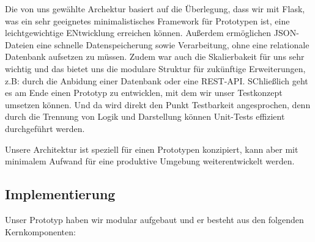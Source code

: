 
Die von uns gewählte Archektur basiert auf die Überlegung, dass wir mit Flask, was ein sehr geeignetes minimalistisches Framework für Prototypen ist, eine leichtgewichtige ENtwicklung erreichen können.
Außerdem ermöglichen JSON-Dateien eine schnelle Datenspeicherung sowie Verarbeitung, ohne eine relationale Datenbank aufsetzen zu müssen. Zudem war auch die Skalierbakeit für uns sehr wichtig und das bietet uns die modulare Struktur für zukünftige Erweiterungen, z.B: durch die Anbidung einer Datenbank oder eine REST-API.
SChließlich geht es am Ende einen Prototyp zu entwicklen, mit dem wir unser Testkonzept umsetzen können. Und da wird direkt den Punkt Testbarkeit angesprochen, denn durch die Trennung von Logik und Darstellung können Unit-Tests effizient durchgeführt werden.\par

Unsere Architektur ist speziell für einen Prototypen konzipiert, kann aber mit minimalem Aufwand für eine produktive Umgebung weiterentwickelt werden.\par

\subsection{Implementierung}

Unser Prototyp haben wir modular aufgebaut und er besteht aus den folgenden Kernkomponenten:

